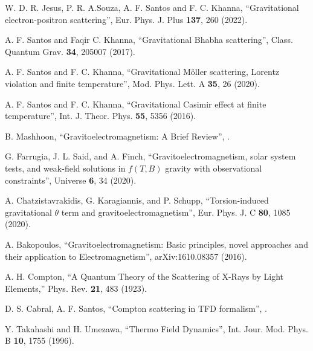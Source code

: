 \documentclass[11pt,showpacs,preprintnumbers,amsmath,amssymb,prd,nofootinbib,superscriptaddress]{revtex4-2}
\begin{document}
\begin{thebibliography}{100}
 W. D. R. Jesus, P. R. A.Souza, A. F. Santos and F. C. Khanna, ``Gravitational electron-positron scattering'', 
 {Eur. Phys. J. Plus {\bf 137}, 260 (2022).}

 A. F. Santos and Faqir C. Khanna, ``Gravitational Bhabha scattering'',  
 {Class. Quantum Grav. {\bf 34}, 205007 (2017).}

 A. F. Santos and F. C. Khanna, ``Gravitational M\"{o}ller scattering, Lorentz violation and finite temperature'',
 {Mod. Phys. Lett. A {\bf 35}, 26 (2020).}

 A. F. Santos and F. C. Khanna, ``Gravitational Casimir effect at finite temperature'',
 {Int. J. Theor. Phys. {\bf 55}, 5356 (2016).}

 B. Mashhoon, ``Gravitoelectromagnetism: A Brief Review'', 
.

 G. Farrugia, J. L. Said, and A. Finch, ``Gravitoelectromagnetism, solar system tests, and weak-field solutions in $f(T,B)$ gravity with observational constraints'',  {Universe {\bf 6}, 34 (2020).}

 A. Chatzistavrakidis, G. Karagiannis, and P. Schupp, ``Torsion-induced gravitational $\theta$ term and gravitoelectromagnetism'',  {Eur. Phys. J. C {\bf 80}, 1085 (2020).}

 A. Bakopoulos, ``Gravitoelectromagnetism: Basic principles, novel approaches and their application to Electromagnetism'',  {arXiv:1610.08357 (2016).}


 A. H. Compton, ``A Quantum Theory of the Scattering of X-Rays by Light Elements,''
 {Phys. Rev. {\bf 21}, 483 (1923).}

 D. S. Cabral, A. F. Santos, ``Compton scattering in TFD formalism'', .

Y. Takahashi and H. Umezawa, ``Thermo Field Dynamics'', 
 {Int. Jour. Mod. Phys. B {\bf 10}, 1755 (1996).}


\end{thebibliography}
\end{document}
